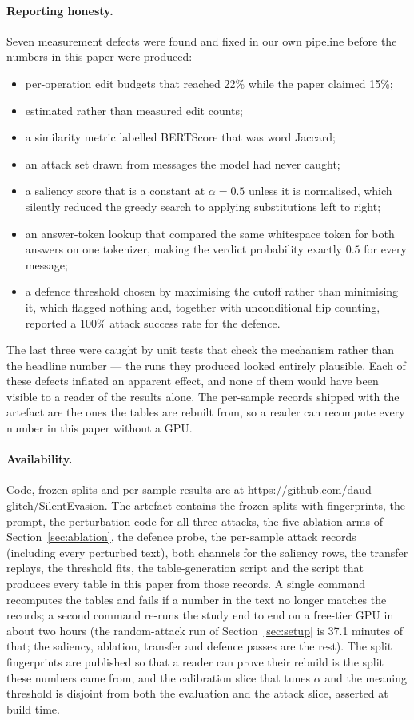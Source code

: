 \paragraph{Reporting honesty.} Seven measurement defects were found and fixed in
our own pipeline before the numbers in this paper were produced:
\begin{itemize}
\item per-operation edit budgets that reached 22\% while the paper claimed 15\%;
\item estimated rather than measured edit counts;
\item a similarity metric labelled BERTScore that was word Jaccard;
\item an attack set drawn from messages the model had never caught;
\item a saliency score that is a constant at $\alpha=0.5$ unless it is
  normalised, which silently reduced the greedy search to applying substitutions
  left to right;
\item an answer-token lookup that compared the same whitespace token for both
  answers on one tokenizer, making the verdict probability exactly $0.5$ for
  every message;
\item a defence threshold chosen by maximising the cutoff rather than minimising
  it, which flagged nothing and, together with unconditional flip counting,
  reported a 100\% attack success rate for the defence.
\end{itemize}
The last three were caught by unit tests that check the mechanism rather than
the headline number --- the runs they produced looked entirely plausible. Each of these defects
inflated an apparent effect, and none of them would have been
visible to a reader of the results alone. The per-sample records shipped with the
artefact are the ones the tables are rebuilt from, so a reader can recompute
every number in this paper without a GPU.

\paragraph{Availability.} Code, frozen splits and per-sample results are at
\url{https://github.com/daud-glitch/SilentEvasion}. The artefact contains the
frozen splits with
fingerprints, the prompt, the perturbation code for all three attacks, the
five ablation arms of Section~\ref{sec:ablation}, the
defence probe, the per-sample attack records (including every perturbed text),
both channels for the saliency rows, the transfer replays, the
threshold fits, the table-generation script and the script that produces every
table in this paper from those records. A single command recomputes the tables
and fails if a number in the text no longer matches the records; a second
command re-runs the study end to end on a free-tier GPU in about two hours (the
random-attack run of Section~\ref{sec:setup} is 37.1 minutes of that; the saliency,
ablation, transfer and defence passes are the rest).
The split fingerprints are published so that a reader can prove their rebuild
is the split these numbers came from, and the calibration slice that tunes
$\alpha$ and the meaning threshold is disjoint from both the evaluation and the
attack slice, asserted at build time.
